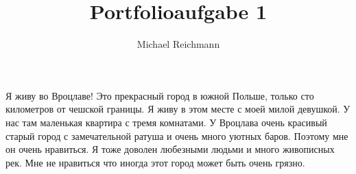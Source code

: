 \documentclass[a4paper]{article}
\title{Portfolioaufgabe 1}
\author{Michael Reichmann}
\begin{document}
\vspace*{1ex}

%
Я живу во Вроцлаве! Это прекрасный город в южной Польше, только сто километров от чешской границы. Я живу в этом месте с моей милой девушкой. У нас там маленькая квартира с тремя комнатами. У Вроцлава очень красивый старый город с замечательной ратуша и очень много уютных баров. Поэтому мне он очень нравиться. Я тоже доволен любезными людьми и много живописных рек. Мне не нравиться что иногда этот город может быть очень грязно.
\end{document}
